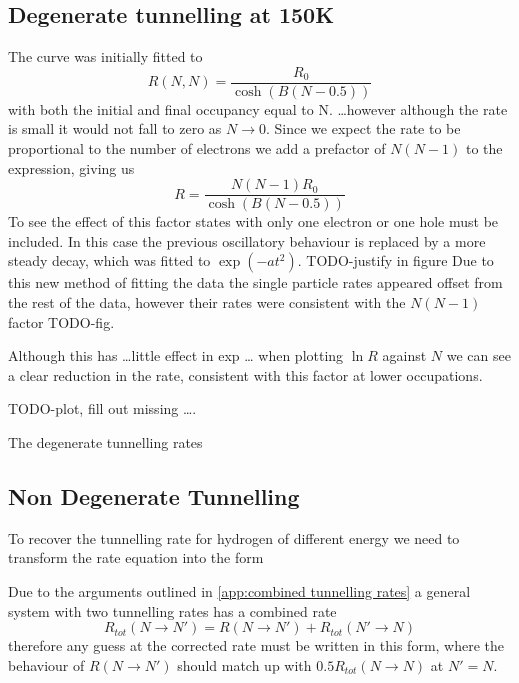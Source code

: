 \subsection{Degenerate tunnelling at 150K}


The curve was initially fitted to
\begin{equation}
    R(N, N) = \frac{R_0}{\cosh{(B(N - 0.5))}}
\end{equation}
with both the initial and final occupancy
equal to N. \ldots however although the rate is small it
would not fall to zero as \(N \rightarrow 0\).
Since we expect the rate to be proportional to the
number of electrons we add a prefactor of \(N(N-1)\)
to the expression, giving us
\begin{equation}
    R = \frac{N(N-1) R_0}{\cosh{(B(N - 0.5))}}
\end{equation}
To see the effect of this factor
states with only
one electron or one hole must be included.
In this
case the previous
oscillatory behaviour is replaced
by a more steady decay, which was fitted to
\(\exp{(-at^2)}\). TODO-justify in figure Due to this new
method of fitting the data the
single particle rates appeared
offset from the rest of the data,
however their rates were consistent
with the \(N(N-1)\) factor TODO-fig.

Although this has \ldots little effect in exp \ldots
when plotting \(\ln{R}\) against \(N\) we can see a
clear reduction in the rate, consistent with this factor
at lower occupations.

TODO-plot, fill out missing \ldots.

The degenerate tunnelling rates

\subsection{Non Degenerate Tunnelling}
To recover the tunnelling rate for hydrogen of different
energy we need to transform the rate equation
into the form

Due to the arguments outlined in
\cref{app:combined tunnelling rates}
a general system with two tunnelling
rates has a combined rate
\begin{equation}
    R_{tot}(N\rightarrow{}N') = R(N\rightarrow{}N') + R_{tot}(N'\rightarrow{}N)
\end{equation}
therefore any guess at the corrected rate
must be written in this form, where the
behaviour of \(R(N\rightarrow{}N')\)
should match up with \(0.5 R_{tot}(N\rightarrow{}N)\)
at \(N' = N\).

